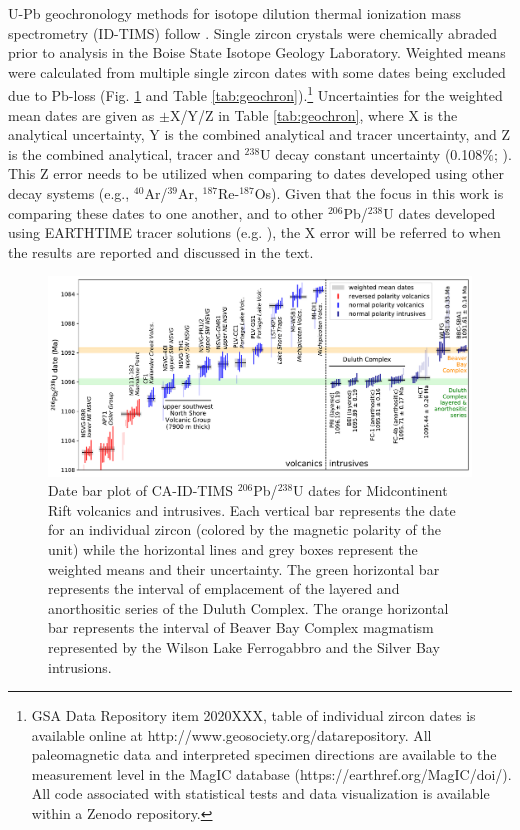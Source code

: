 \documentclass[11pt,letterpaper]{article}
\begin{document}
U-Pb geochronology methods for isotope dilution thermal ionization mass spectrometry (ID-TIMS) follow \citet{Schmitz2012a}. Single zircon crystals were chemically abraded prior to analysis in the Boise State Isotope Geology Laboratory. Weighted means were calculated from multiple single zircon dates with some dates being excluded due to Pb-loss (Fig. \ref{fig:dates} and Table \ref{tab:geochron}).\footnote{GSA Data Repository item 2020XXX, table of individual zircon dates is available online at http://www.geosociety.org/datarepository. All paleomagnetic data and interpreted specimen directions are available to the measurement level in the MagIC database (https://earthref.org/MagIC/doi/).  All code associated with statistical tests and data visualization is available within a Zenodo repository.} Uncertainties for the weighted mean dates are given as $\pm$X/Y/Z in Table \ref{tab:geochron}, where X is the analytical uncertainty, Y is the combined analytical and tracer uncertainty, and Z is the combined analytical, tracer and $^{238}$U decay constant uncertainty (0.108$\%$; \citealp{Jaffey1971a}). This Z error needs to be utilized when comparing to dates developed using other decay systems (e.g., $^{40}$Ar/$^{39}$Ar, $^{187}$Re-$^{187}$Os). Given that the focus in this work is comparing these dates to one another, and to other $^{206}$Pb/$^{238}$U dates developed using EARTHTIME tracer solutions (e.g. \citealp{Swanson-Hysell2019a}), the X error will be referred to when the results are reported and discussed in the text. 

\begin{figure}[!ht]
\noindent\includegraphics[width=\textwidth]{./Figures/MCR_Dates.pdf}
\caption{\small{Date bar plot of CA-ID-TIMS $^{206}$Pb/$^{238}$U dates for Midcontinent Rift volcanics and intrusives. Each vertical bar represents the date for an individual zircon (colored by the magnetic polarity of the unit) while the horizontal lines and grey boxes represent the weighted means and their uncertainty. The green horizontal bar represents the interval of emplacement of the layered and anorthositic series of the Duluth Complex. The orange horizontal bar represents the interval of Beaver Bay Complex magmatism represented by the Wilson Lake Ferrogabbro and the Silver Bay intrusions.}}
\label{fig:dates}
\end{figure}
\end{document}
